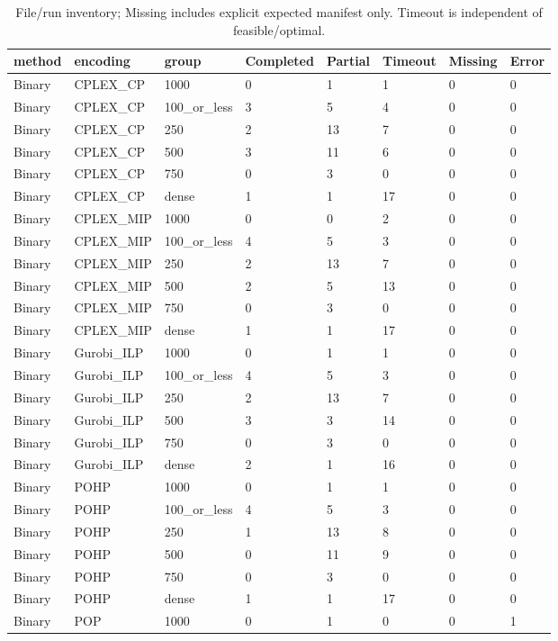 \begin{table}[htbp]
\centering
\caption{File/run inventory; Missing includes explicit expected manifest only. Timeout is independent of feasible/optimal.}
\label{tab:coverage}
\begin{tabular}{llllllll}
\hline
method & encoding & group & Completed & Partial & Timeout & Missing & Error \\
\hline
Binary & CPLEX\_CP & 1000 & 0 & 1 & 1 & 0 & 0 \\
Binary & CPLEX\_CP & 100\_or\_less & 3 & 5 & 4 & 0 & 0 \\
Binary & CPLEX\_CP & 250 & 2 & 13 & 7 & 0 & 0 \\
Binary & CPLEX\_CP & 500 & 3 & 11 & 6 & 0 & 0 \\
Binary & CPLEX\_CP & 750 & 0 & 3 & 0 & 0 & 0 \\
Binary & CPLEX\_CP & dense & 1 & 1 & 17 & 0 & 0 \\
Binary & CPLEX\_MIP & 1000 & 0 & 0 & 2 & 0 & 0 \\
Binary & CPLEX\_MIP & 100\_or\_less & 4 & 5 & 3 & 0 & 0 \\
Binary & CPLEX\_MIP & 250 & 2 & 13 & 7 & 0 & 0 \\
Binary & CPLEX\_MIP & 500 & 2 & 5 & 13 & 0 & 0 \\
Binary & CPLEX\_MIP & 750 & 0 & 3 & 0 & 0 & 0 \\
Binary & CPLEX\_MIP & dense & 1 & 1 & 17 & 0 & 0 \\
Binary & Gurobi\_ILP & 1000 & 0 & 1 & 1 & 0 & 0 \\
Binary & Gurobi\_ILP & 100\_or\_less & 4 & 5 & 3 & 0 & 0 \\
Binary & Gurobi\_ILP & 250 & 2 & 13 & 7 & 0 & 0 \\
Binary & Gurobi\_ILP & 500 & 3 & 3 & 14 & 0 & 0 \\
Binary & Gurobi\_ILP & 750 & 0 & 3 & 0 & 0 & 0 \\
Binary & Gurobi\_ILP & dense & 2 & 1 & 16 & 0 & 0 \\
Binary & POHP & 1000 & 0 & 1 & 1 & 0 & 0 \\
Binary & POHP & 100\_or\_less & 4 & 5 & 3 & 0 & 0 \\
Binary & POHP & 250 & 1 & 13 & 8 & 0 & 0 \\
Binary & POHP & 500 & 0 & 11 & 9 & 0 & 0 \\
Binary & POHP & 750 & 0 & 3 & 0 & 0 & 0 \\
Binary & POHP & dense & 1 & 1 & 17 & 0 & 0 \\
Binary & POP & 1000 & 0 & 1 & 0 & 0 & 1 \\

\end{tabular}
\end{table}
